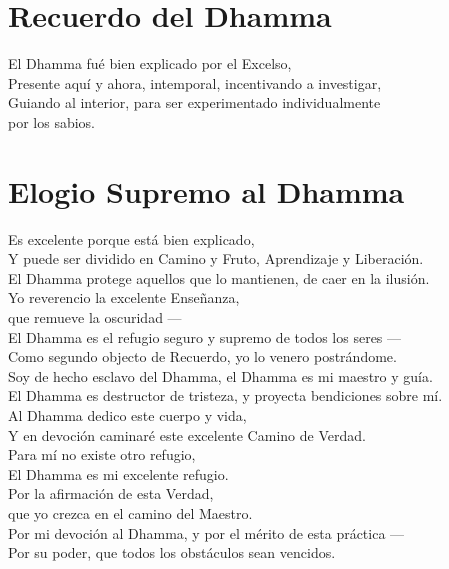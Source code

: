 \clearpage

\chapter{Recuerdo del Dhamma}

\begin{leader}
\end{leader}


El Dhamma fué bien explicado por el Excelso,\\
Presente aquí y ahora, intemporal, incentivando a investigar,\\
Guiando al interior, para ser experimentado individualmente\\
\vin por los sabios.


\nextChapterUseDelegatedPageNumber

\chapter{Elogio Supremo al Dhamma}

\begin{leader}
\end{leader}

\enlargethispage{\baselineskip}

Es excelente porque está bien explicado,\\
Y puede ser dividido en Camino y Fruto, Aprendizaje y Liberación.\\
El Dhamma protege aquellos que lo mantienen, de caer en la ilusión.\\
Yo reverencio la excelente Enseñanza,\\
\vin que remueve la oscuridad ---\\
El Dhamma es el refugio seguro y supremo de todos los seres ---\\
Como segundo objecto de Recuerdo, yo lo venero postrándome.\\
Soy de hecho esclavo del Dhamma, el Dhamma es mi maestro y guía.\\
El Dhamma es destructor de tristeza, y proyecta bendiciones sobre mí.\\
Al Dhamma dedico este cuerpo y vida,\\
Y en devoción caminaré este excelente Camino de Verdad.\\
Para mí no existe otro refugio,\\
\vin El Dhamma es mi excelente refugio.\\
Por la afirmación de esta Verdad,\\
\vin que yo crezca en el camino del Maestro.\\
Por mi devoción al Dhamma, y por el mérito de esta práctica ---\\
Por su poder, que todos los obstáculos sean vencidos.

